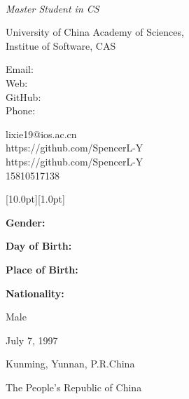 \documentclass[12pt,a4paper,utf8]{report}
\newcommand{\namefont}[1]{{\normalfont\bfseries\Huge{#1}}}
\newcommand{\myname}{Xie Li (李勰)}
\newcommand{\mydegree}{Master Student in CS}
\newcommand{\mywork}{}
\begin{document}
\begin{minipage}[t]{8cm}
    \begin{center}
        \vspace{0.0cm}\namefont{\myname}\\[0.1cm]
    \end{center}
\end{minipage}
\begin{minipage}[t]{8cm}
    \vspace{0.0cm}
    {\em{\mydegree}}\par
    {\em{\mywork}}\par
\end{minipage}

\begin{minipage}[t]{8cm}
    \vspace{0.4cm}
    University of China Academy of Sciences,\\
    Institue of Software, CAS \\
\end{minipage}
\begin{minipage}[t]{1.5cm}
    \vspace{0.4cm}
    Email: \\
    Web: \\
    GitHub: \\
    Phone: \\
\end{minipage}
\begin{minipage}[t]{8cm}
    \vspace{0.4cm}
    lixie19@ios.ac.cn \\
    https://github.com/SpencerL-Y \\
    https://github.com/SpencerL-Y \\
    15810517138 \\
\end{minipage}
\vspace{-0.2cm}

\begin{minipage}[t]{16cm}
    \colorbox{subtitlecolor}{\raisebox{0pt}[10.0pt][1.0pt]{
        \textcolor{white}{\textsf{}}}}
\end{minipage}\par
\vspace{0.2cm}
    \begin{minipage}[t]{4cm}
        \qquad \textbf{Gender:}\par
        \qquad \textbf{Day of Birth:}\par
        \qquad \textbf{Place of Birth:}\par
        \qquad \textbf{Nationality:}\par
    \end{minipage}
    \begin{minipage}[t]{12cm}
        Male \par
        July 7, 1997 \par
        Kunming, Yunnan,  P.R.China \par
        The People's Republic of China \par
    \end{minipage}\par
\vspace{0.4cm}
\end{document}
